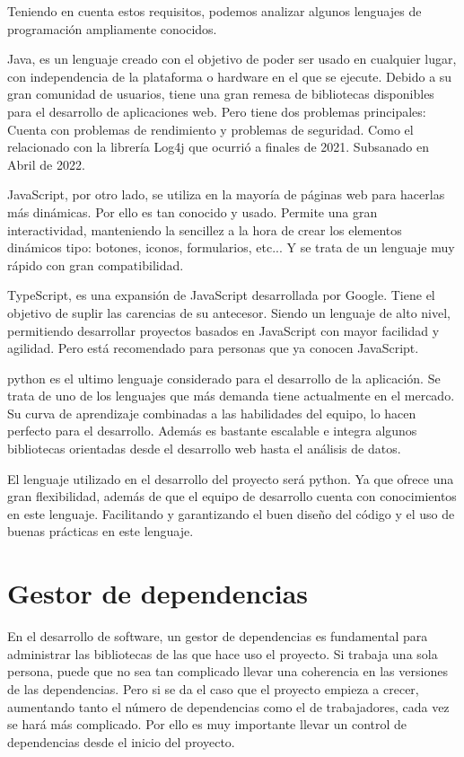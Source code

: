 Teniendo en cuenta estos requisitos, podemos analizar algunos lenguajes de programación ampliamente conocidos. 

Java, es un lenguaje creado con el objetivo de poder ser usado en cualquier lugar, con independencia de la plataforma o hardware en el que se ejecute. Debido a su gran comunidad de usuarios, tiene una gran remesa de bibliotecas disponibles para el desarrollo de aplicaciones web. Pero tiene dos problemas principales: Cuenta con problemas de rendimiento y problemas de seguridad. Como el relacionado con la librería Log4j que ocurrió a finales de 2021. Subsanado en Abril de 2022.\cite{cisa}

JavaScript, por otro lado, se utiliza en la mayoría de páginas web para hacerlas más dinámicas. Por ello es tan conocido y usado. Permite una gran interactividad, manteniendo la sencillez a la hora de crear los elementos dinámicos tipo: botones, iconos, formularios, etc... Y se trata de un lenguaje muy rápido con gran compatibilidad.

TypeScript, es una expansión de JavaScript desarrollada por Google. Tiene el objetivo de suplir las carencias de su antecesor. Siendo un lenguaje de alto nivel, permitiendo desarrollar proyectos basados en JavaScript con mayor facilidad y agilidad. Pero está recomendado para personas que ya conocen JavaScript.

\Gls{python} es el ultimo lenguaje considerado para el desarrollo de la aplicación. Se trata de uno de los lenguajes que más demanda tiene actualmente en el mercado. Su curva de aprendizaje combinadas a las habilidades del equipo, lo hacen perfecto para el desarrollo. Además es bastante escalable e integra algunos bibliotecas orientadas desde el desarrollo web hasta el análisis de datos.

El lenguaje utilizado en el desarrollo del proyecto será \Gls{python}. Ya que ofrece una gran flexibilidad, además de que el equipo de desarrollo cuenta con conocimientos en este lenguaje. Facilitando y garantizando el buen diseño del código y el uso de buenas prácticas en este lenguaje.

\section{Gestor de dependencias}
En el desarrollo de software, un gestor de \glspl{dependencia} es fundamental para administrar las bibliotecas de las que hace uso el proyecto. Si trabaja una sola persona, puede que no sea tan complicado llevar una coherencia en las versiones de las \glspl{dependencia}. Pero si se da el caso que el proyecto empieza a crecer, aumentando tanto el número de \glspl{dependencia} como el de trabajadores, cada vez se hará más complicado. Por ello es muy importante llevar un control de \glspl{dependencia} desde el inicio del proyecto.

